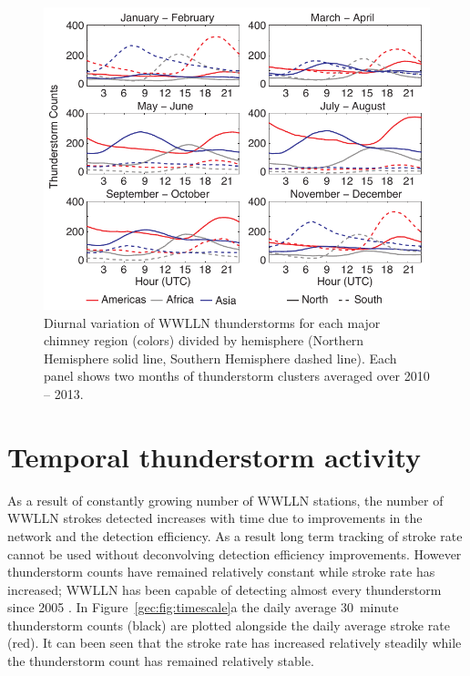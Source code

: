  \begin{figure}[ht!]
    \centering
    \includegraphics[scale=1]{GEC/Figures/bimonthly.pdf} 
    \caption{Diurnal variation of WWLLN thunderstorms for each major chimney region (colors) divided by hemisphere (Northern Hemisphere solid line, Southern Hemisphere dashed line).
    		Each panel shows two months of thunderstorm clusters averaged over 2010 -- 2013.
		 }
    \label{gec:fig:bimonthly}
 \end{figure}

\section{Temporal thunderstorm activity}

As a result of constantly growing number of WWLLN stations, the number of WWLLN strokes detected increases with time due to improvements in the network and the detection efficiency.
As a result long term tracking of stroke rate  cannot be used without deconvolving detection efficiency improvements.
However thunderstorm counts have remained relatively constant while stroke rate has increased; WWLLN has been capable of detecting almost every thunderstorm since 2005 \citep{Jacobson2006c}.
In Figure~\ref{gec:fig:timescale}a the daily average 30~minute thunderstorm counts (black) are plotted alongside the daily average stroke rate (red).
It can been seen that the stroke rate has increased relatively steadily while the thunderstorm count has remained relatively stable.

